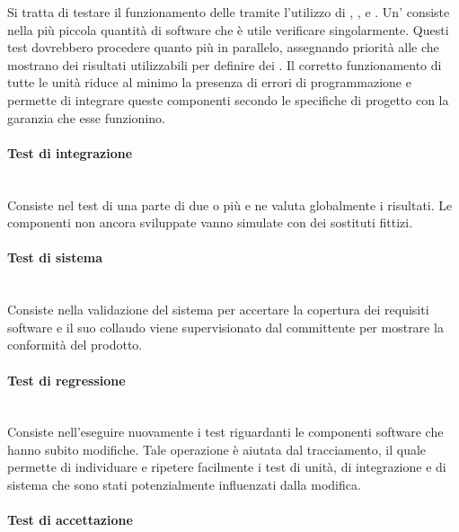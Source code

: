 			Si tratta di testare il funzionamento delle  tramite l'utilizzo di , , e . Un' consiste nella più piccola quantità di software che è utile verificare singolarmente.
			Questi test dovrebbero procedere quanto più in parallelo, assegnando priorità alle  che mostrano dei risultati utilizzabili per definire dei . Il corretto funzionamento di tutte le unità riduce al minimo la presenza di errori di programmazione e permette di integrare queste componenti secondo le specifiche di progetto con la garanzia che esse funzionino.
			 
			\paragraph{Test di integrazione} \mbox{} \\

			Consiste nel test di una parte di due o più  e ne valuta globalmente i risultati. Le componenti non ancora sviluppate vanno simulate con dei sostituti fittizi.
			
			\paragraph{Test di sistema} \mbox{} \\

			Consiste nella validazione del sistema per accertare la copertura dei requisiti software e il suo collaudo viene supervisionato dal committente per mostrare la conformità del prodotto.
			
			\paragraph{Test di regressione} \mbox{} \\

			Consiste nell'eseguire nuovamente i test riguardanti le componenti software che hanno subito modifiche.	Tale operazione è aiutata dal tracciamento, il quale permette di individuare e ripetere facilmente i test di unità, di integrazione e di sistema che sono stati potenzialmente influenzati dalla modifica.
			
			\paragraph{Test di accettazione} \mbox{} \\

